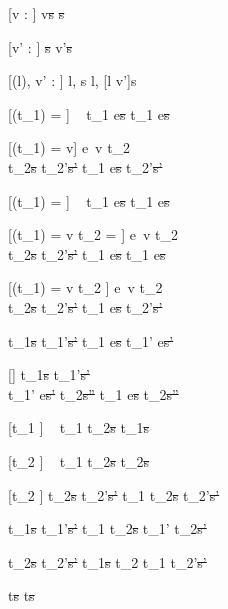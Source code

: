 [v : \beta]
  { }
  {\Edit v\st{s} \handle{\Clear} \Fill \beta\st{s}}

[v' : \beta]
  { }
  {\Fill \beta\st{s}  \Edit v'\st{s}}

[\Sigma(l), v' : \tau]
  { }
{\Change l, s  \Change l, [l \mapsto v']s}

[\Observe(t_1) = \nothing]
  {\ }
  {t_1 \ExThen e\st{s} \handle{\Next} t_1 \ExThen e\st{s}}

[\Observe(t_1) = v]
  {e\ v \evaluate t_2    \\
   t_2\st{s} \normalise t_2'\st{s'} }
  {t_1 \ExThen e\st{s} \handle{\Next} t_2'\st{s'}}

[\Observe(t_1) = \nothing]
  {\ }
  {t_1 \Then e\st{s} \handle{\Execute \pi} t_1 \Then e\st{s}}

[\Observe(t_1) = v \land t_2 = \Fail]
  {e\ v \evaluate t_2    \\
   t_2\st{s} \handle{\Pick \pi} t_2'\st{s'} }
  {t_1 \Then e\st{s} \handle{\Execute \pi} t_1 \Then e\st{s}}

[\Observe(t_1) = v \land t_2 \neq \Fail]
  {e\ v \evaluate t_2    \\
   t_2\st{s} \handle{\Pick \pi} t_2'\st{s'} }
  {t_1 \Then e\st{s} \handle{\Execute \pi} t_2'\st{s'}}

  {t_1\st{s} \handle{\eta} t_1'\st{s'}}
  {t_1 \ExThen e\st{s} \handle{\eta} t_1' \ExThen e\st{s'}}

[\eta \neq \Execute \pi]
  {t_1\st{s} \handle{\eta} t_1'\st{s'}       \\
   t_1' \Then e\st{s'} \normalise t_2\st{s''} }
  {t_1 \Then e\st{s} \handle{\eta} t_2\st{s''}}

[t_1 \neq \Fail]
  {\ }
  {t_1 \One t_2\st{s} \handle{\Pick \First} t_1\st{s}}

[t_2 \neq \Fail]
  {\ }
  {t_1 \One t_2\st{s} \handle{\Pick \Second} t_2\st{s}}

[t_2 \neq \Fail]
  {t_2\st{s} \handle{\Pick \pi} t_2'\st{s'}}
  {t_1 \One t_2\st{s} \handle{\Pick \Other \pi} t_2'\st{s'}}

  {t_1\st{s} \handle{\eta} t_1'\st{s'} }
  {t_1 \AndOr t_2\st{s} \handle{\Left \eta} t_1' \AndOr t_2\st{s'}}

  {t_2\st{s} \handle{\eta} t_2'\st{s'} }
  {t_1\st{s} \AndOr t_2 \handle{\Right \eta} t_1 \AndOr t_2'\st{s'}}

  { }
  {t\st{s} \handle{\eta} t\st{s}}
